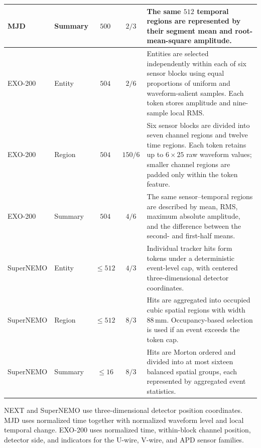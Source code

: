 \begin{table}[!htbp]
\begin{tabularx}{\linewidth}{@{}llccX@{}}
MJD
& Summary
& $500$
& $2/3$
& The same $512$ temporal regions are represented by their segment mean and
root-mean-square amplitude. \\

\midrule

EXO-200
& Entity
& $504$
& $2/6$
& Entities are selected independently within each of six sensor blocks using
equal proportions of uniform and waveform-salient samples. Each token stores
amplitude and nine-sample local RMS. \\

EXO-200
& Region
& $504$
& $150/6$
& Six sensor blocks are divided into seven channel regions and twelve time
regions. Each token retains up to $6\times25$ raw waveform values; smaller
channel regions are padded only within the token feature. \\

EXO-200
& Summary
& $504$
& $4/6$
& The same sensor--temporal regions are described by mean, RMS, maximum
absolute amplitude, and the difference between the second- and first-half
means. \\

\midrule

SuperNEMO
& Entity
& $\leq512$
& $4/3$
& Individual tracker hits form tokens under a deterministic event-level cap,
with centered three-dimensional detector coordinates. \\

SuperNEMO
& Region
& $\leq512$
& $8/3$
& Hits are aggregated into occupied cubic spatial regions with width
$88\,\mathrm{mm}$. Occupancy-based selection is used if an event exceeds the
token cap. \\

SuperNEMO
& Summary
& $\leq16$
& $8/3$
& Hits are Morton ordered and divided into at most sixteen balanced spatial
groups, each represented by aggregated event statistics. \\

\bottomrule
\end{tabularx}
\end{table}

NEXT and SuperNEMO use three-dimensional detector position coordinates. MJD
uses normalized time together with normalized waveform level and local
temporal change. EXO-200 uses normalized time, within-block channel position,
detector side, and indicators for the U-wire, V-wire, and APD sensor
families.

\FloatBarrier